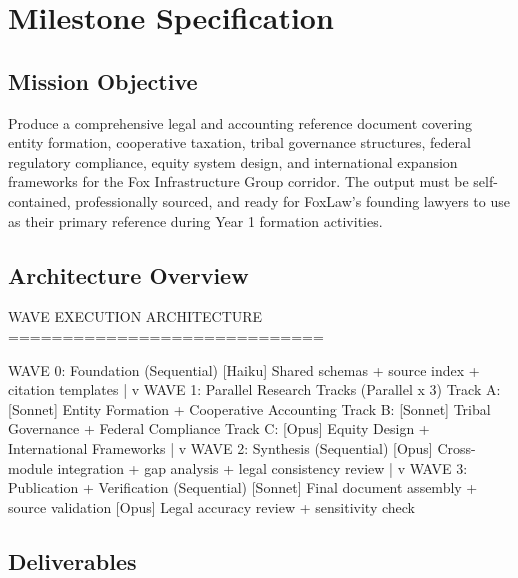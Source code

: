 \documentclass[11pt,letterpaper]{article}
\newcommand{\stageheader}[2]{%
  \noindent\colorbox{#2}{\makebox[\textwidth][l]{%
    \textcolor{white}{\bfseries\sffamily\hspace{6pt}#1\hspace{6pt}}}}%
  \vspace{0.5em}\par%
}
\begin{document}
\newpage

\stageheader{STAGE 3 --- MISSION PACKAGE}{tertiary}

\section{Milestone Specification}

\subsection{Mission Objective}

Produce a comprehensive legal and accounting reference document covering entity formation, cooperative taxation, tribal governance structures, federal regulatory compliance, equity system design, and international expansion frameworks for the Fox Infrastructure Group corridor. The output must be self-contained, professionally sourced, and ready for FoxLaw's founding lawyers to use as their primary reference during Year 1 formation activities.

\subsection{Architecture Overview}

\begin{asciibox}
WAVE EXECUTION ARCHITECTURE
=============================

WAVE 0: Foundation (Sequential)
  [Haiku] Shared schemas + source index + citation templates
     |
     v
WAVE 1: Parallel Research Tracks (Parallel x 3)
  Track A: [Sonnet] Entity Formation + Cooperative Accounting
  Track B: [Sonnet] Tribal Governance + Federal Compliance
  Track C: [Opus]  Equity Design + International Frameworks
     |
     v
WAVE 2: Synthesis (Sequential)
  [Opus] Cross-module integration + gap analysis + legal
         consistency review
     |
     v
WAVE 3: Publication + Verification (Sequential)
  [Sonnet] Final document assembly + source validation
  [Opus]  Legal accuracy review + sensitivity check
\end{asciibox}

\subsection{Deliverables}
\end{document}
